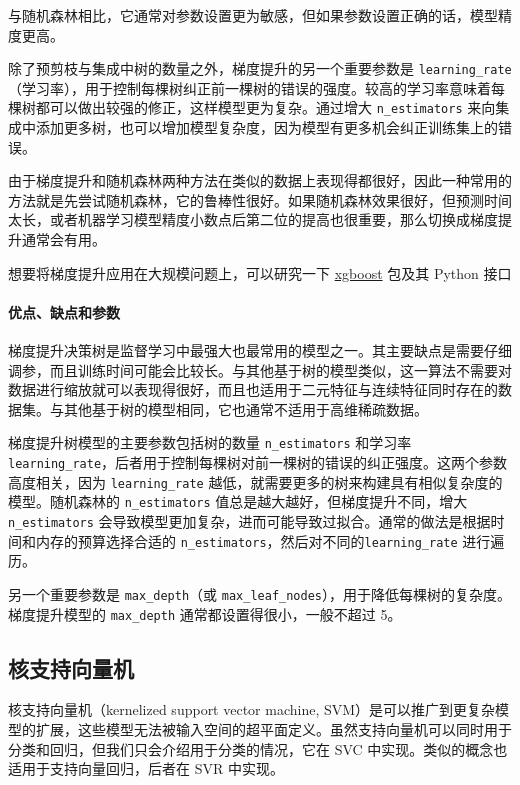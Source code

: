与随机森林相比，它通常对参数设置更为敏感，但如果参数设置正确的话，模型精度更高。

除了预剪枝与集成中树的数量之外，梯度提升的另一个重要参数是 \verb|learning_rate|（学习率），用于控制每棵树纠正前一棵树的错误的强度。较高的学习率意味着每棵树都可以做出较强的修正，这样模型更为复杂。通过增大 \verb|n_estimators| 来向集成中添加更多树，也可以增加模型复杂度，因为模型有更多机会纠正训练集上的错误。

\begin{tcolorbox}
    由于梯度提升和随机森林两种方法在类似的数据上表现得都很好，因此一种常用的方法就是先尝试随机森林，它的鲁棒性很好。如果随机森林效果很好，但预测时间太长，或者机器学习模型精度小数点后第二位的提高也很重要，那么切换成梯度提升通常会有用。
\end{tcolorbox}

想要将梯度提升应用在大规模问题上，可以研究一下 \href{https://xgboost.readthedocs.io/en/stable/#}{xgboost} 包及其 Python 接口
\paragraph{优点、缺点和参数} 梯度提升决策树是监督学习中最强大也最常用的模型之一。其主要缺点是需要仔细调参，而且训练时间可能会比较长。与其他基于树的模型类似，这一算法不需要对数据进行缩放就可以表现得很好，而且也适用于二元特征与连续特征同时存在的数据集。与其他基于树的模型相同，它也通常不适用于高维稀疏数据。

梯度提升树模型的主要参数包括树的数量 \verb|n_estimators| 和学习率 \verb|learning_rate|，后者用于控制每棵树对前一棵树的错误的纠正强度。这两个参数高度相关，因为 \verb|learning_rate| 越低，就需要更多的树来构建具有相似复杂度的模型。随机森林的 \verb|n_estimators| 值总是越大越好，但梯度提升不同，增大 \verb|n_estimators| 会导致模型更加复杂，进而可能导致过拟合。通常的做法是根据时间和内存的预算选择合适的 \verb|n_estimators|，然后对不同的\verb|learning_rate| 进行遍历。

另一个重要参数是 \verb|max_depth|（或 \verb|max_leaf_nodes|），用于降低每棵树的复杂度。梯度提升模型的 \verb|max_depth| 通常都设置得很小，一般不超过 5。

\subsection{核支持向量机}
核支持向量机（kernelized support vector machine, SVM）是可以推广到更复杂模型的扩展，这些模型无法被输入空间的超平面定义。虽然支持向量机可以同时用于分类和回归，但我们只会介绍用于分类的情况，它在 SVC 中实现。类似的概念也适用于支持向量回归，后者在 SVR 中实现。

